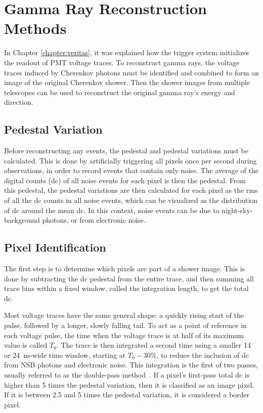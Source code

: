 \cleartooddpage[\thispagestyle{empty}]
\newcommand{\ETrue}{$\textrm{E}_{\textrm{True}}$}

\chapter{Gamma Ray Reconstruction Methods}\label{ch:grrecon}

In Chapter \ref{chapter:veritas}, it was explained how the trigger system initializes the readout of PMT voltage traces.
To reconstruct gamma rays, the voltage traces induced by Cherenkov photons must be identified and combined to form an image of the original Cherenkov shower.
Then the shower images from multiple telescopes can be used to reconstruct the original gamma ray's energy and direction.

\section{Pedestal Variation}
  Before reconstructing any events, the pedestal and pedestal variations must be calculated.
  This is done by artificially triggering all pixels once per second during observations, in order to record events that contain only noise.
  The average of the digital counts (dc) of all noise events for each pixel is then the pedestal.
  From this pedestal, the pedestal variations are then calculated for each pixel as the rms of all the dc counts in all noise events, which can be visualized as the distribution of dc around the mean dc.
  In this context, noise events can be due to night-sky-background photons, or from electronic noise.

\section{Pixel Identification}
  The first step is to determine which pixels are part of a shower image.
  This is done by subtracting the dc pedestal from the entire trace, and then summing all trace bins within a fixed window, called the integration length, to get the total dc.

  Most voltage traces have the same general shape: a quickly rising start of the pulse, followed by a longer, slowly falling tail.
  To act as a point of reference in each voltage pulse, the time when the voltage trace is at half of its maximum value is called $T_{0}$.
  The trace is then integrated a second time using a smaller 14 or \SI{24}{ns}-wide time window, starting at $T_0 - 30\%$, to reduce the inclusion of dc from NSB photons and electronic noise.
  This integration is the first of two passes, usually referred to as the double-pass method~\cite{doublepass}.
  If a pixel's first-pass total dc is higher than 5 times the pedestal variation, then it is classified as an image pixel.
  If it is between 2.5 and 5 times the pedestal variation, it is considered a border pixel.

